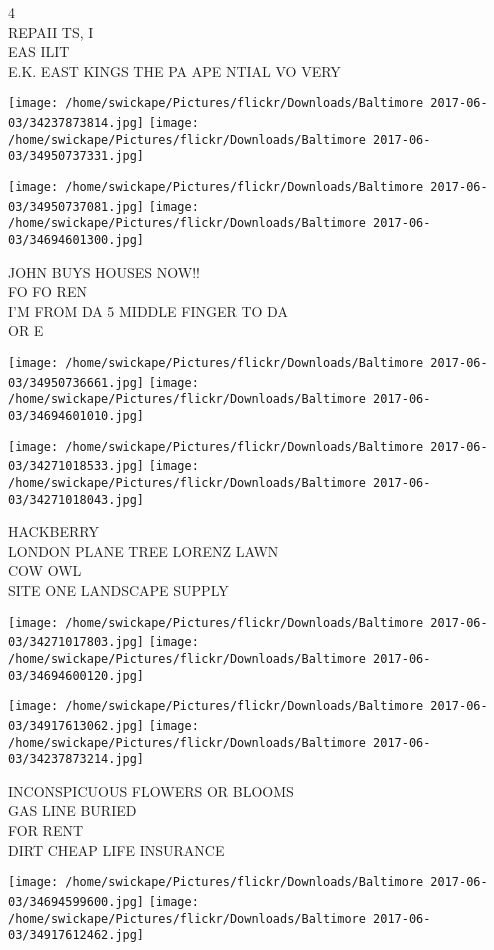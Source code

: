 \documentclass[10pt,letterpaper]{article}
\begin{document}
4\\
REPAII TS, I\\
EAS ILIT\\
E.K. EAST KINGS THE PA APE NTIAL VO VERY
\pagebreak

\texttt{[image: /home/swickape/Pictures/flickr/Downloads/Baltimore 2017-06-03/34237873814.jpg]}
\texttt{[image: /home/swickape/Pictures/flickr/Downloads/Baltimore 2017-06-03/34950737331.jpg]}

\texttt{[image: /home/swickape/Pictures/flickr/Downloads/Baltimore 2017-06-03/34950737081.jpg]}
\texttt{[image: /home/swickape/Pictures/flickr/Downloads/Baltimore 2017-06-03/34694601300.jpg]}

JOHN BUYS HOUSES NOW!!\\
FO FO REN\\
I'M FROM DA 5 MIDDLE FINGER TO DA\\
OR E
\pagebreak

\texttt{[image: /home/swickape/Pictures/flickr/Downloads/Baltimore 2017-06-03/34950736661.jpg]}
\texttt{[image: /home/swickape/Pictures/flickr/Downloads/Baltimore 2017-06-03/34694601010.jpg]}

\texttt{[image: /home/swickape/Pictures/flickr/Downloads/Baltimore 2017-06-03/34271018533.jpg]}
\texttt{[image: /home/swickape/Pictures/flickr/Downloads/Baltimore 2017-06-03/34271018043.jpg]}

HACKBERRY\\
LONDON PLANE TREE LORENZ LAWN\\
COW OWL\\
SITE ONE LANDSCAPE SUPPLY
\pagebreak

\texttt{[image: /home/swickape/Pictures/flickr/Downloads/Baltimore 2017-06-03/34271017803.jpg]}
\texttt{[image: /home/swickape/Pictures/flickr/Downloads/Baltimore 2017-06-03/34694600120.jpg]}

\texttt{[image: /home/swickape/Pictures/flickr/Downloads/Baltimore 2017-06-03/34917613062.jpg]}
\texttt{[image: /home/swickape/Pictures/flickr/Downloads/Baltimore 2017-06-03/34237873214.jpg]}

INCONSPICUOUS FLOWERS OR BLOOMS\\
GAS LINE BURIED\\
FOR RENT\\
DIRT CHEAP LIFE INSURANCE
\pagebreak

\texttt{[image: /home/swickape/Pictures/flickr/Downloads/Baltimore 2017-06-03/34694599600.jpg]}
\texttt{[image: /home/swickape/Pictures/flickr/Downloads/Baltimore 2017-06-03/34917612462.jpg]}
\end{document}
